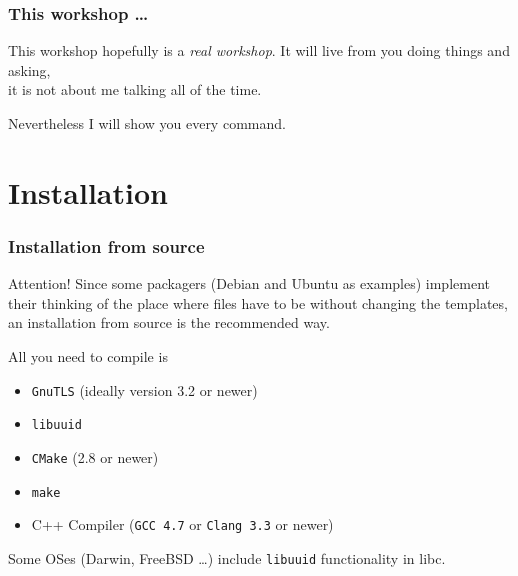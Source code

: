 \documentclass[t]{beamer}
\begin{document}
\begin{frame}[fragile]\frametitle{This workshop \ldots}
    \vfill

    \begin{alertblock}{This workshop hopefully is a \textit{real workshop}.}
        It will live from you doing things and asking, \\
        it is not about me talking all of the time.
    \end{alertblock}

    {\tiny Nevertheless I will show you every command.}
\end{frame}

\section{Installation}

\begin{frame}[fragile]\frametitle{Installation from source}

    \begin{alertblock}{Attention!}
        Since some packagers (Debian and Ubuntu as examples) implement their thinking of the place where files have to be without changing the templates, an installation from source is the recommended way.
    \end{alertblock}
    \pause

    All you need to compile is
    \begin{itemize}
        \item \verb+GnuTLS+ (ideally version 3.2 or newer)
        \item \verb+libuuid+
        \item \verb+CMake+ (2.8 or newer)
        \item \verb+make+
        \item C++ Compiler (\verb+GCC 4.7+ or \verb+Clang 3.3+ or newer)
    \end{itemize}

    Some OSes (Darwin, FreeBSD \ldots) include \verb+libuuid+ functionality in libc.
\end{frame}
\end{document}
